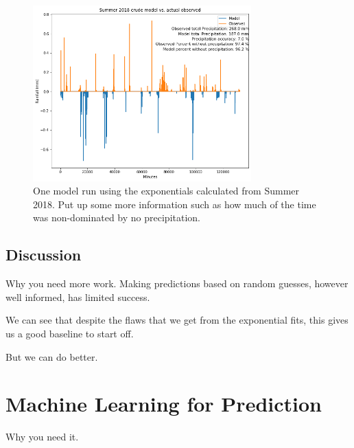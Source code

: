 \documentclass[11pt]{report}
\begin{document}
\begin{figure}[b]
  \centering
  \includegraphics[width=0.75\textwidth]{Figures/run_with_more_info.png}
  \caption[More  run using Summer 2018 climatology]
  {\label{crudesmodel} One model run using the exponentials calculated from
    Summer 2018. Put up some more information such as how much of the time
    was non-dominated by no precipitation.}
\end{figure}
\clearpage

\subsection{Discussion}\label{sec:spc_d}

Why you need more work. Making predictions based on random guesses, however
well informed, has limited success.

We can see that despite the flaws that we get from the exponential fits,
this gives us a good baseline to start off.


But we can do better. 

\clearpage

\section{Machine Learning for Prediction}\label{sec:MLP}






Why you need it. 
\end{document}
